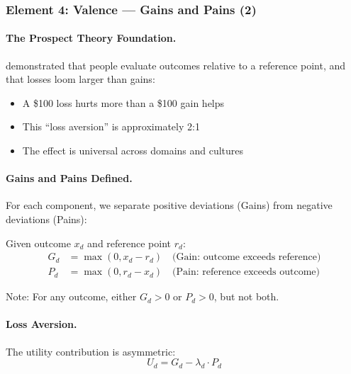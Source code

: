 \subsubsection{Element 4: Valence --- Gains and Pains (2)}

\paragraph{The Prospect Theory Foundation.}
\citet{kahnemantversky1979} demonstrated that people evaluate outcomes 
relative to a reference point, and that losses loom larger than gains:

\begin{itemize}
\item A \$100 loss hurts more than a \$100 gain helps
\item This ``loss aversion'' is approximately 2:1
\item The effect is universal across domains and cultures
\end{itemize}

\paragraph{Gains and Pains Defined.}
For each component, we separate positive deviations (Gains) from 
negative deviations (Pains):

\begin{definition}
\label{def:gains-pains}
Given outcome $x_d$ and reference point $r_d$:
\begin{align}
G_d &= \max(0, x_d - r_d) \quad \text{(Gain: outcome exceeds reference)} \\
P_d &= \max(0, r_d - x_d) \quad \text{(Pain: reference exceeds outcome)}
\end{align}
\end{definition}

Note: For any outcome, either $G_d > 0$ or $P_d > 0$, but not both.

\paragraph{Loss Aversion.}
The utility contribution is asymmetric:
\begin{equation}
U_d = G_d - \lambda_d \cdot P_d
\label{eq:loss-aversion}
\end{equation}

